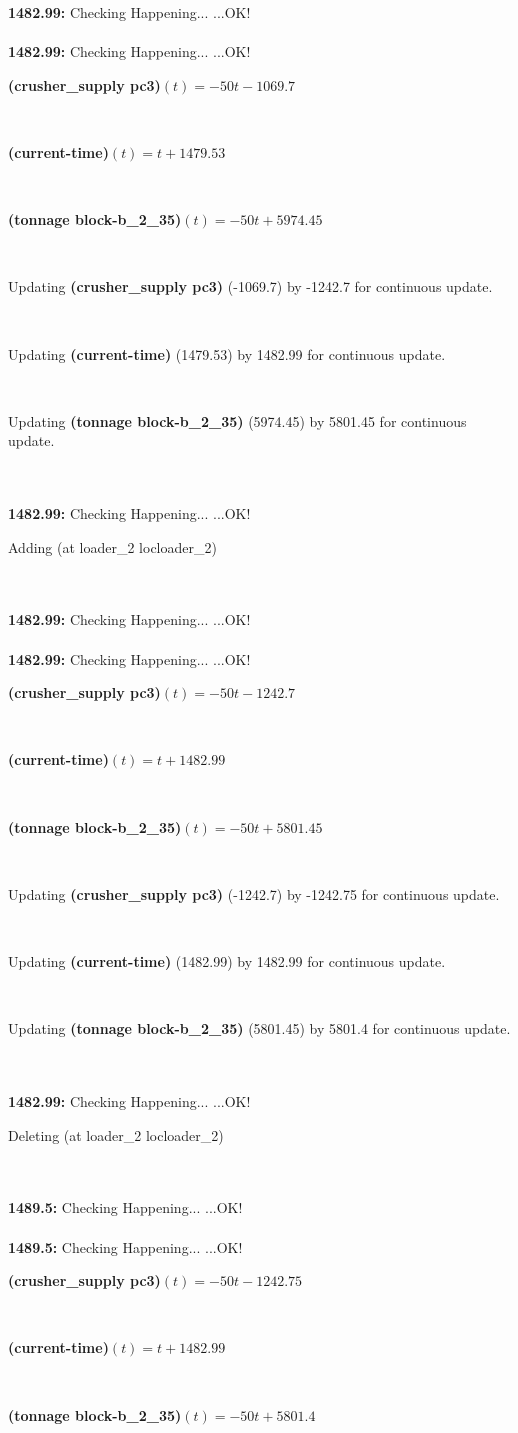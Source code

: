 \documentclass[a4paper,12pt]{article}
\newcommand{\atime}[1]{{\bf #1:}}
\newcommand{\exprn}[1]{{\sf #1}}
\newcommand{\fexprn}[1]{{\small {\bf #1}}}
\newcommand{\checkhappening}{Checking Happening... }
\newcommand{\listrow}[1]{\begin{minipage}[t]{11.5cm} #1 \end{minipage}}
\newcommand{\happeningOK}{...OK!}
\newcommand{\assignmentcts}[3]{\listrow{Updating \fexprn{#1} (#2) by #3 for continuous update.}}
\newcommand{\function}[2]{\listrow{\fexprn{#1}$(t) = #2$}}
\newcommand{\adding}[1]{\listrow{Adding \exprn{#1} }}
\newcommand{\deleting}[1]{\listrow{Deleting \exprn{#1} }}
\begin{document}
\begin{tabbing}
\atime{1482.99} \> \checkhappening\happeningOK\\
\\
\atime{1482.99} \> \checkhappening\happeningOK\\
 \> \function{(crusher\_supply pc3)}{ - 50t - 1069.7}\\
 \> \function{(current-time)}{t + 1479.53}\\
 \> \function{(tonnage block-b\_2\_35)}{ - 50t + 5974.45}\\
 \> \assignmentcts{(crusher\_supply pc3)}{-1069.7}{-1242.7}\\
 \> \assignmentcts{(current-time)}{1479.53}{1482.99}\\
 \> \assignmentcts{(tonnage block-b\_2\_35)}{5974.45}{5801.45}\\
\\
\atime{1482.99} \> \checkhappening\happeningOK\\
 \> \adding{(at loader\_2 locloader\_2)}\\
\\
\atime{1482.99} \> \checkhappening\happeningOK\\
\\
\atime{1482.99} \> \checkhappening\happeningOK\\
 \> \function{(crusher\_supply pc3)}{ - 50t - 1242.7}\\
 \> \function{(current-time)}{t + 1482.99}\\
 \> \function{(tonnage block-b\_2\_35)}{ - 50t + 5801.45}\\
 \> \assignmentcts{(crusher\_supply pc3)}{-1242.7}{-1242.75}\\
 \> \assignmentcts{(current-time)}{1482.99}{1482.99}\\
 \> \assignmentcts{(tonnage block-b\_2\_35)}{5801.45}{5801.4}\\
\\
\atime{1482.99} \> \checkhappening\happeningOK\\
 \> \deleting{(at loader\_2 locloader\_2)}\\
\\
\atime{1489.5} \> \checkhappening\happeningOK\\
\\
\atime{1489.5} \> \checkhappening\happeningOK\\
 \> \function{(crusher\_supply pc3)}{ - 50t - 1242.75}\\
 \> \function{(current-time)}{t + 1482.99}\\
 \> \function{(tonnage block-b\_2\_35)}{ - 50t + 5801.4}\\

\end{tabbing}
\end{document}
